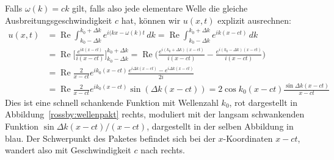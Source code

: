 Falls $\omega(k)=ck$ gilt, falls also jede elementare Welle die gleiche
Ausbreitungsgeschwindigkeit $c$ hat, können wir $u(x,t)$ explizit
ausrechnen:
\begin{align*}
u(x,t)
&=
\operatorname{Re}
\int_{k_0-\Delta k}^{k_0+\Delta k}
e^{i(kx-\omega(k)t}\,dk
=
\operatorname{Re}
\int_{k_0-\Delta k}^{k_0+\Delta k}
e^{ik(x-ct)}\,dk
\\
&=
\operatorname{Re}
\biggl[
\frac{e^{ik(x-ct)}}{i(x-ct)}
\biggr]_{k_0-\Delta k}^{k_0+\Delta k}
=
\operatorname{Re}
\biggl(
\frac{e^{i(k_0+\Delta k)(x-ct)}}{i(x-ct)}
-
\frac{e^{i(k_0-\Delta k)(x-ct)}}{i(x-ct)}
\biggr)
\\
&=
\operatorname{Re}\frac{2}{x-ct}
e^{ik_0(x-ct)}\frac{e^{i\Delta k(x-ct)}-e^{i\Delta k(x-ct)}}{2i}
\\
&=
\operatorname{Re}\frac{2}{x-ct}
e^{ik_0(x-ct)}
\sin (\Delta k(x-ct))
=
2\cos k_0(x-ct) \frac{\sin \Delta k(x-ct)}{x-ct}
\end{align*}
Dies ist eine schnell schankende Funktion mit Wellenzahl $k_0$, rot
dargestellt in Abbildung~\ref{rossby:wellenpakt} rechts, moduliert
mit der langsam schwankenden Funktion $\sin\Delta k(x-ct)/(x-ct)$,
dargestellt in der selben Abbildung in blau.
Der Schwerpunkt des Paketes befindet sich bei der $x$-Koordinaten $x-ct$,
wandert also mit Geschwindigkeit $c$ nach rechts.

